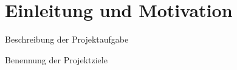 \chapter{Einleitung und Motivation}
\label{introduction-and-motivation}

Beschreibung der Projektaufgabe

Benennung der Projektziele


